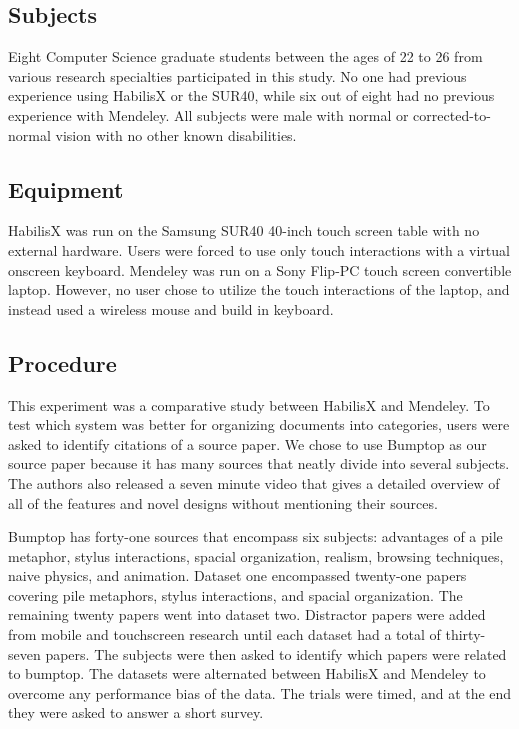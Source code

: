 \documentclass{article}
\begin{document}
\subsection*{Subjects}
	Eight Computer Science graduate students between the ages of 22 to 26 from various research specialties participated in this study.  No one had previous experience using HabilisX or the SUR40, while six out of eight had no previous experience with Mendeley. All subjects were male with  normal or corrected-to-normal vision with no other known disabilities. 
\subsection*{Equipment}
	HabilisX was run on the Samsung SUR40 40-inch touch screen table with no external hardware.  Users were forced to use only touch interactions with a virtual onscreen keyboard. Mendeley was run on a Sony Flip-PC touch screen convertible laptop.  However, no user chose to utilize the touch interactions of the laptop, and instead used a wireless mouse and build in keyboard.  
	
\subsection*{Procedure}

	This experiment was a comparative study between HabilisX and Mendeley.  To test which system was better for organizing documents into categories, users were asked to identify citations of a source paper.  We chose to use Bumptop \cite{Agarawala2006}
	as our source paper because it has many sources that neatly divide into several subjects.  The authors also released a seven minute video that gives a detailed overview of all of the features and novel designs without mentioning their sources.   
	
	Bumptop has forty-one sources that encompass six subjects: advantages of a pile metaphor, stylus interactions, spacial organization, realism, browsing techniques, naive physics, and animation.  Dataset one encompassed twenty-one papers covering pile metaphors, stylus interactions, and spacial organization.  The remaining twenty papers went into dataset two.  Distractor papers were added from mobile and touchscreen research until each dataset had a total of thirty-seven papers.  The subjects were then asked to identify which papers were related to bumptop.  The datasets were alternated between HabilisX and Mendeley to overcome any performance bias of the data.  The trials were timed, and at the end they were asked to answer a short survey.  
	
\end{document}
